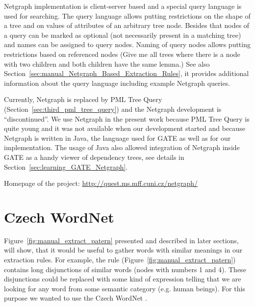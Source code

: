 Netgraph implementation is client-server based and a special query language is used for searching. The query language allows putting restrictions on the shape of a tree and on values of attributes of an arbitrary tree node. Besides that nodes of a query can be marked as optional (not necessarily present in a matching tree) and names can be assigned to query nodes. Naming of query nodes allows putting restrictions based on referenced nodes (Give me all trees where there is a node with two children and both children have the same lemma.) See also Section~\ref{sec:manual_Netgraph_Based_Extraction_Rules}, it provides additional information about the query language including example Netgraph queries.

Currently, Netgraph is replaced by PML Tree Query (Section~\ref{sec:third_pml_tree_query}) and the Netgraph development is ``discontinued''. We use Netgraph in the present work because PML Tree Query is quite young and it was not available when our development started and because Netgraph is written in Java, the language used for GATE as well as for our implementation. The usage of Java also allowed integration of Netgraph inside GATE as a handy viewer of dependency trees, see details in Section~\ref{sec:learning_GATE_Netgraph}. 

\medskip
Homepage of the project: \url{http://quest.ms.mff.cuni.cz/netgraph/}




\section{Czech WordNet}

Figure~\ref{fig:manual_extract_patern} presented and described in later sections, will show, that it would be useful to gather words with similar meanings in our extraction rules. For example, the rule (Figure~\ref{fig:manual_extract_patern}) contains long disjunctions of similar words (nodes with numbers 1 and 4). These disjunctions could be replaced with some kind of expression telling that we are looking for any word from some semantic category (e.g. human beings). For this purpose we wanted to use the Czech WordNet \citep{biblio:WordNetCZ2004}. 

